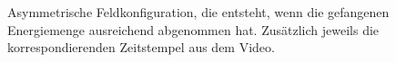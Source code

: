 \begin{figure}
    \begin{center}
        \hfill
        \caption{%
            Asymmetrische Feldkonfiguration, die entsteht, wenn die gefangenen Energiemenge ausreichend abgenommen hat. 
            Zusätzlich jeweils die korrespondierenden Zeitstempel aus dem Video.}\label{particles:fig:partikel:abnehmen:asymmetrisch}
    \end{center}
\end{figure}